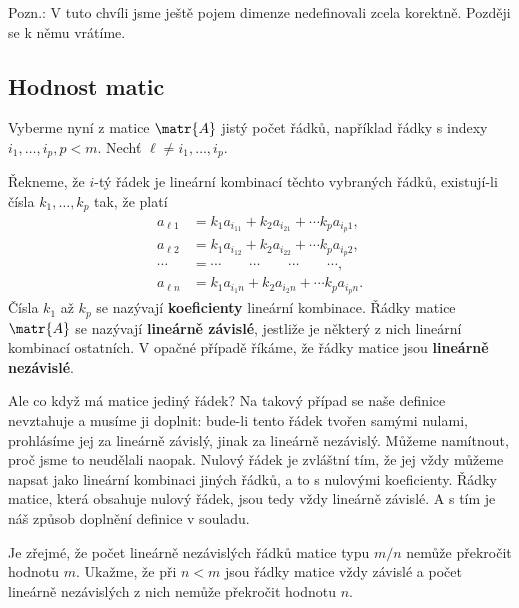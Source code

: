       Pozn.: V tuto chvíli jsme ještě pojem dimenze nedefinovali zcela korektně. Později se k němu 
      vrátíme.
      
    \subsection{Hodnost matic}\label{mai:IchapIIsecIIIsubII}
      Vyberme nyní z matice \(\matr{A}\) jistý počet řádků, například řádky s indexy \(i_1, \ldots, 
      i_p, p < m\). Nechť \(\ell \neq i_1, \ldots, i_p\).

      \begin{mdframed}[style=highlight]
        Řekneme, že \(i\)-tý řádek je lineární kombinací těchto vybraných řádků, existují-li čísla 
        \(k_1, \ldots, k_p\) tak, že platí
        \begin{align*}
          a_{\ell1}  &= k_1 a_{i_11} + k_2 a_{i_21} + \cdots k_p a_{i_p1},       \\
          a_{\ell2}  &= k_1 a_{i_12} + k_2 a_{i_22} + \cdots k_p a_{i_p2},       \\
          \cdots     &= \cdots \qquad \cdots \qquad \cdots \qquad \cdots,        \\
          a_{\ell n} &= k_1 a_{i_1n} + k_2 a_{i_2n} + \cdots k_p a_{i_pn}.
        \end{align*}
        Čísla \(k_1\) až \(k_p\) se nazývají \textbf{koeficienty} lineární kombinace. Řádky matice 
        \(\matr{A}\) se nazývají \textbf{lineárně závislé}, jestliže je některý z nich lineární 
        kombinací ostatních. V opačné případě říkáme, že řádky matice jsou \textbf{lineárně 
        nezávislé}.
      \end{mdframed}
      
      Ale co když má matice jediný řádek? Na takový případ se naše definice nevztahuje a musíme ji 
      doplnit: bude-li tento řádek tvořen samými nulami, prohlásíme jej za lineárně závislý, jinak 
      za lineárně nezávislý. Můžeme namítnout, proč jsme to neudělali naopak. Nulový řádek je 
      zvláštní tím, že jej vždy můžeme napsat jako lineární kombinaci jiných řádků, a to s nulovými 
      koeficienty. Řádky matice, která obsahuje nulový řádek, jsou tedy vždy lineárně závislé. A s 
      tím je náš způsob doplnění definice v souladu. 
      
      Je zřejmé, že počet lineárně nezávislých řádků matice typu \(m/n\) nemůže překročit hodnotu 
      \(m\). Ukažme, že při \(n < m\) jsou řádky matice vždy závislé a počet lineárně nezávislých z 
      nich nemůže překročit hodnotu \(n\).
      
